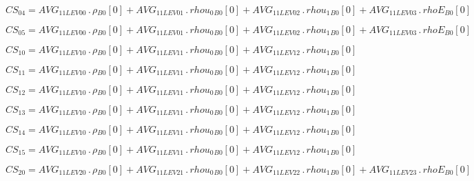 \documentclass{article}
\begin{document}
\begin{dmath}CS_{04} = AVG_{1 1 LEV 00} \,.\, {\rho{_{B0}}}[{0}] + AVG_{1 1 LEV 01} \,.\, {rhou_{0}{_{B0}}}[{0}] + AVG_{1 1 LEV 02} \,.\, {rhou_{1}{_{B0}}}[{0}] + AVG_{1 1 LEV 03} \,.\, {rhoE{_{B0}}}[{0}]\end{dmath}

\begin{dmath}CS_{05} = AVG_{1 1 LEV 00} \,.\, {\rho{_{B0}}}[{0}] + AVG_{1 1 LEV 01} \,.\, {rhou_{0}{_{B0}}}[{0}] + AVG_{1 1 LEV 02} \,.\, {rhou_{1}{_{B0}}}[{0}] + AVG_{1 1 LEV 03} \,.\, {rhoE{_{B0}}}[{0}]\end{dmath}

\begin{dmath}CS_{10} = AVG_{1 1 LEV 10} \,.\, {\rho{_{B0}}}[{0}] + AVG_{1 1 LEV 11} \,.\, {rhou_{0}{_{B0}}}[{0}] + AVG_{1 1 LEV 12} \,.\, {rhou_{1}{_{B0}}}[{0}]\end{dmath}

\begin{dmath}CS_{11} = AVG_{1 1 LEV 10} \,.\, {\rho{_{B0}}}[{0}] + AVG_{1 1 LEV 11} \,.\, {rhou_{0}{_{B0}}}[{0}] + AVG_{1 1 LEV 12} \,.\, {rhou_{1}{_{B0}}}[{0}]\end{dmath}

\begin{dmath}CS_{12} = AVG_{1 1 LEV 10} \,.\, {\rho{_{B0}}}[{0}] + AVG_{1 1 LEV 11} \,.\, {rhou_{0}{_{B0}}}[{0}] + AVG_{1 1 LEV 12} \,.\, {rhou_{1}{_{B0}}}[{0}]\end{dmath}

\begin{dmath}CS_{13} = AVG_{1 1 LEV 10} \,.\, {\rho{_{B0}}}[{0}] + AVG_{1 1 LEV 11} \,.\, {rhou_{0}{_{B0}}}[{0}] + AVG_{1 1 LEV 12} \,.\, {rhou_{1}{_{B0}}}[{0}]\end{dmath}

\begin{dmath}CS_{14} = AVG_{1 1 LEV 10} \,.\, {\rho{_{B0}}}[{0}] + AVG_{1 1 LEV 11} \,.\, {rhou_{0}{_{B0}}}[{0}] + AVG_{1 1 LEV 12} \,.\, {rhou_{1}{_{B0}}}[{0}]\end{dmath}

\begin{dmath}CS_{15} = AVG_{1 1 LEV 10} \,.\, {\rho{_{B0}}}[{0}] + AVG_{1 1 LEV 11} \,.\, {rhou_{0}{_{B0}}}[{0}] + AVG_{1 1 LEV 12} \,.\, {rhou_{1}{_{B0}}}[{0}]\end{dmath}

\begin{dmath}CS_{20} = AVG_{1 1 LEV 20} \,.\, {\rho{_{B0}}}[{0}] + AVG_{1 1 LEV 21} \,.\, {rhou_{0}{_{B0}}}[{0}] + AVG_{1 1 LEV 22} \,.\, {rhou_{1}{_{B0}}}[{0}] + AVG_{1 1 LEV 23} \,.\, {rhoE{_{B0}}}[{0}]\end{dmath}
\end{document}
